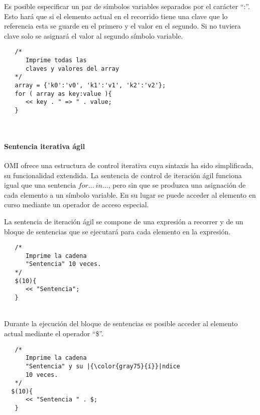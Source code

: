 Es posible especificar un par de símbolos variables separados por el carácter ``:''. Esto hará que si el elemento actual en el recorrido tiene una clave que lo referencia esta se guarde en 
el primero y el valor en el segundo. Si no tuviera clave solo se asignará el valor al segundo símbolo variable. \\


\begin{lstlisting}
   /*
      Imprime todas las 
      claves y valores del array
   */
   array = {'k0':'v0', 'k1':'v1', 'k2':'v2'};
   for ( array as key:value ){
      << key . " => " . value; 
   }
\end{lstlisting}
\hfill\\

\paragraph{Sentencia iterativa ágil} \label{sec:stmt_agil}

OMI ofrece una estructura de control iterativa cuya sintaxis ha sido simplificada, su funcionalidad extendida. La sentencia de control de iteración ágil funciona
igual que una sentencia $for...\ in...$, pero sin que se produzca una asignación de cada elemento a un símbolo variable. En su lugar se puede acceder al elemento 
en curso mediante un operador de acceso especial.

La sentencia de iteración ágil se compone de una expresión a recorrer y de un bloque de sentencias que se ejecutará para cada elemento en la expresión. \\

\begin{lstlisting}
   /*
      Imprime la cadena 
      "Sentencia" 10 veces.
   */
   $(10){
      << "Sentencia"; 
   }
\end{lstlisting}
\hfill\\

Durante la ejecución del bloque de sentencias es posible acceder al elemento actual mediante el operador ``\$''. \\

\begin{lstlisting}
   /*
      Imprime la cadena 
      "Sentencia" y su |{\color{gray75}{í}}|ndice 
      10 veces.
   */
  $(10){
      << "Sentencia " . $; 
   }
\end{lstlisting}
\hfill\\

